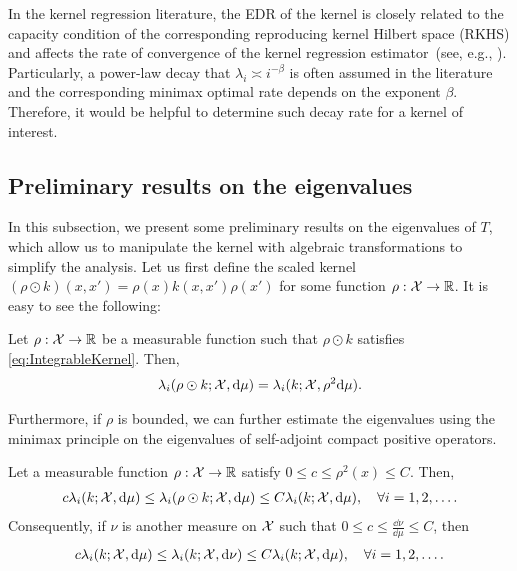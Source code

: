 In the kernel regression literature,
the EDR of the kernel is closely related to the capacity condition of the corresponding reproducing kernel Hilbert space (RKHS)
and affects the rate of convergence of the kernel regression estimator~(see, e.g., \citet{caponnetto2007_OptimalRates,lin2018_OptimalRates}).
Particularly, a power-law decay that $\lambda_{i} \asymp i^{-\beta}$ is often assumed in the literature
and the corresponding minimax optimal rate depends on the exponent $\beta$.
Therefore, it would be helpful to determine such decay rate for a kernel of interest.



\subsection{Preliminary results on the eigenvalues}
\label{subsec:preliminary-results-on-the-eigenvalues}
In this subsection, we present some preliminary results on the eigenvalues of $T$,
which allow us to manipulate the kernel with algebraic transformations to simplify the analysis.
Let us first define the scaled kernel $(\rho \odot k)(x,x') = \rho(x) k(x,x') \rho(x')$ for some function $\rho: \mathcal{X} \to \mathbb{R}$.
It is easy to see the following:
\begin{proposition}
  \label{prop:ScaleMeasureEquiv}
  Let $\rho: \mathcal{X} \to \mathbb{R}$ be a measurable function such that $\rho\odot k$ satisfies \cref{eq:IntegrableKernel}.
  Then,
  \begin{align}
    \lambda_i(\rho \odot k;\mathcal{X},\dd \mu) = \lambda_i(k;\mathcal{X},\rho^2 \dd \mu).
  \end{align}
\end{proposition}

Furthermore, if $\rho$ is bounded, we can further estimate the eigenvalues using the minimax principle on the eigenvalues of self-adjoint compact positive operators.

\begin{lemma}
  \label{lem:ScaledKernel}
  Let a measurable function $\rho: \mathcal{X} \to \mathbb{R}$ satisfy $0\leq c \leq \rho^2(x) \leq C$.
  Then,
  \begin{align*}
    c \lambda_i(k;\mathcal{X},\dd \mu) \leq \lambda_i(\rho \odot k;\mathcal{X},\dd \mu) \leq C \lambda_i(k;\mathcal{X},\dd \mu),
    \quad \forall i = 1,2,\dots.
  \end{align*}
  Consequently, if $\nu$ is another measure on $\mathcal{X}$ such that $0 \leq c \leq \frac{\dd \nu}{\dd \mu} \leq C$,
  then
  \begin{align}
    \label{eq:MeasureInv}
    c \lambda_i(k;\mathcal{X},\dd \mu) \leq \lambda_i(k;\mathcal{X},\dd \nu) \leq C \lambda_i(k;\mathcal{X},\dd \mu), \quad \forall i = 1,2,\dots.
  \end{align}
\end{lemma}



